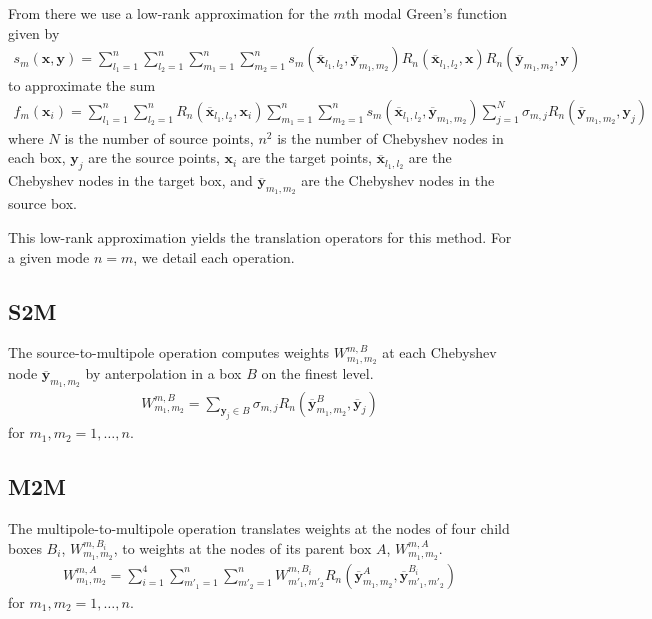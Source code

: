 \documentclass[11pt, oneside]{article}   	%
\begin{document}
From there we use a low-rank approximation for the $m$th modal Green's function given by
\begin{align}
s_m(\mathbf{x},\mathbf{y}) = \sum_{l_1=1}^n\sum_{l_2=1}^n\sum_{m_1=1}^n\sum_{m_2=1}^n s_m(\mathbf{\overline{x}}_{l_1,l_2},\mathbf{\overline{y}}_{m_1,m_2})R_n(\mathbf{\overline{x}}_{l_1,l_2},\mathbf{x})R_n(\mathbf{\overline{y}}_{m_1,m_2},\mathbf{y})
\end{align}
to approximate the sum
\begin{align}
f_m(\mathbf{x}_i)=\sum_{l_1=1}^n \sum_{l_2=1}^n R_n(\mathbf{\overline{x}}_{l_1,l_2},\mathbf{x}_i) \sum_{m_1=1}^n \sum_{m_2=1}^n s_m(\mathbf{\overline{x}}_{l_1,l_2},\mathbf{\overline{y}}_{m_1,m_2}) \sum_{j=1}^N \sigma_{m,j}R_n(\mathbf{\overline{y}}_{m_1,m_2},\mathbf{y}_j)
\end{align}
where $N$ is the number of source points, $n^2$ is the number of Chebyshev nodes in each box, $\mathbf{y}_j$ are the source points, $\mathbf{x}_i$ are the target points, $\mathbf{\overline{x}}_{l_1,l_2}$ are the Chebyshev nodes in the target box, and $\mathbf{\overline{y}}_{m_1,m_2}$ are the Chebyshev nodes in the source box.

This low-rank approximation yields the translation operators for this method. For a given mode $n=m$, we detail each operation.
\subsection{S2M}
The source-to-multipole operation computes weights $W^{m,B}_{m_1,m_2}$ at each Chebyshev node $\mathbf{\overline{y}}_{m_1,m_2}$ by anterpolation in a box $B$ on the finest level.
\begin{align}
W_{m_1,m_2}^{m,B} = \sum_{\mathbf{y}_j\in B} \sigma_{m,j} R_n(\mathbf{\overline{y}}^B_{m_1,m_2},\mathbf{\overline{y}}_j)
\end{align}
for $m_1,m_2 = 1,\dots,n$.
\subsection{M2M}
The multipole-to-multipole operation translates weights at the nodes of four child boxes $B_i$, $W_{m_1,m_2}^{m,B_i}$, to weights at the nodes of its parent box $A$, $W_{m_1,m_2}^{m,A}$.
\begin{align}
W_{m_1,m_2}^{m,A} = \sum_{i=1}^4 \sum_{m'_1=1}^n\sum_{m'_2=1}^n W_{m'_1,m'_2}^{m,B_i} R_n(\mathbf{\overline{y}}^A_{m_1,m_2},\mathbf{\overline{y}}^{B_i}_{m'_1,m'_2})
\end{align}
for $m_1,m_2= 1,\dots,n$.
\end{document}
